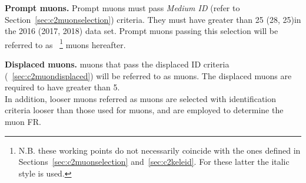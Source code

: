 \textbf {Prompt muons.}
Prompt muons must pass \emph{Medium ID} (refer
to Section~\ref{sec:c2muonselection}) criteria. They must have \pt greater than
25 (28, 25)\GeV in the 2016 (2017, 2018) data set.
Prompt muons passing this selection will be referred to as \tP~\footnote{
N.B. these working points do not necessarily coincide with the ones
defined in Sections~\ref{sec:c2muonselection}
and~\ref{sec:c2keleid}. For these latter the italic style is used.} muons hereafter.

\textbf {Displaced muons.}
\Displ muons that pass the displaced ID criteria
(~\ref{sec:c2muondisplaced}) will be referred to as \tD
muons. The displaced muons are required to have \pt greater than 5\GeV.\\
In addition, looser muons referred as \fo muons are selected
with identification criteria looser than those used for \tD muons, and are employed to determine the muon FR.

